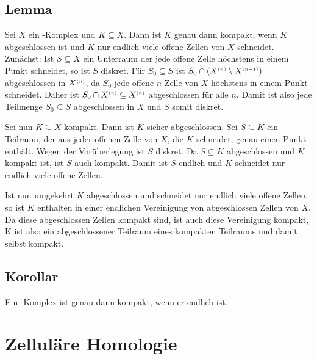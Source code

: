 \subsection[Lemma: Kompaktheit von Teilmengen eines \CW-Komplexes]{Lemma} %
\label{sub:116}
Sei $X$ ein \CW-Komplex und $K \subseteq X$. Dann ist $K$ genau dann kompakt, wenn $K$ abgeschlossen ist und $K$ nur endlich viele offene Zellen von $X$ schneidet.
Zunächst: Ist $S \subseteq X$ ein Unterraum der jede offene Zelle höchstens in einem Punkt schneidet, so ist $S$ diskret. Für $S_0 \subseteq S$ ist 
$S_0 \cap (X^{\scriptscriptstyle(n)} \setminus X^{\scriptscriptstyle(n-1)})$ abgeschlossen in $X^{\scriptscriptstyle(n)}$, da $S_0$ jede offene $n$-Zelle von $X$ höchstens in einem Punkt schneidet.  Daher ist 
$S_0 \cap X^{\scriptscriptstyle(n)} \subseteq X^{\scriptscriptstyle(n)}$ abgeschlossen für alle $n$. Damit ist also jede Teilmenge $S_0 \subseteq S$ abgeschlossen in $X$ und $S$ somit diskret.

Sei nun $K \subseteq X$ kompakt. Dann ist $K$ sicher abgeschlossen. Sei $S \subseteq K$ ein Teilraum, der aus jeder offenen Zelle von $X$, die $K$ schneidet, genau einen 
Punkt enthält. Wegen der Vorüberlegung ist $S$ diskret. Da $S \subseteq K$ abgeschlossen und $K$ kompakt ist, ist $S$ auch kompakt. Damit ist $S$ endlich und $K$
schneidet nur endlich viele offene Zellen.

Ist nun umgekehrt $K$ abgeschlossen und schneidet nur endlich viele offene Zellen, so ist $K$ enthalten in einer endlichen Vereinigung von abgeschlossen Zellen von $X$.
Da diese abgeschlossen Zellen kompakt sind, ist auch diese Vereinigung kompakt, K ist also ein abgeschlossener Teilraum eines kompakten Teilraums und damit selbst kompakt.
\bewende

\subsection[Korollar: Ein \CW-Komplex ist genau dann kompakt, wenn er endlich ist.]{Korollar} %
\label{sub:117}
Ein \CW-Komplex ist genau dann kompakt, wenn er endlich ist.
\newpage

\section{Zelluläre Homologie} %
\label{sec:12}

